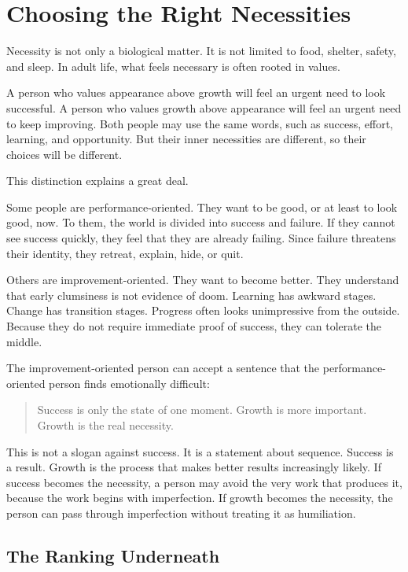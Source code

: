 \chapter{Choosing the Right Necessities}

Necessity is not only a biological matter. It is not limited to food, shelter, safety, and sleep. In adult life, what feels necessary is often rooted in values.

A person who values appearance above growth will feel an urgent need to look successful. A person who values growth above appearance will feel an urgent need to keep improving. Both people may use the same words, such as success, effort, learning, and opportunity. But their inner necessities are different, so their choices will be different.

This distinction explains a great deal.

Some people are performance-oriented. They want to be good, or at least to look good, now. To them, the world is divided into success and failure. If they cannot see success quickly, they feel that they are already failing. Since failure threatens their identity, they retreat, explain, hide, or quit.

Others are improvement-oriented. They want to become better. They understand that early clumsiness is not evidence of doom. Learning has awkward stages. Change has transition stages. Progress often looks unimpressive from the outside. Because they do not require immediate proof of success, they can tolerate the middle.

The improvement-oriented person can accept a sentence that the performance-oriented person finds emotionally difficult:

\begin{quote}
Success is only the state of one moment. Growth is more important. Growth is the real necessity.
\end{quote}

This is not a slogan against success. It is a statement about sequence. Success is a result. Growth is the process that makes better results increasingly likely. If success becomes the necessity, a person may avoid the very work that produces it, because the work begins with imperfection. If growth becomes the necessity, the person can pass through imperfection without treating it as humiliation.

\section*{The Ranking Underneath}

